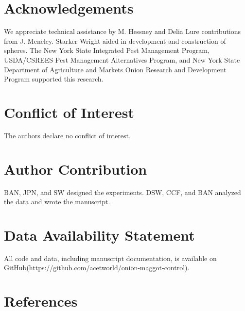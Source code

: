 \documentclass[num-refs]{wiley-article}
\begin{document}
\section*{Acknowledgements}
We appreciate technical assistance by M. Hessney and Delia Lure contributions from J. Meneley. Starker Wright aided in development and construction of spheres.  The New York State Integrated Pest Management Program, USDA/CSREES Pest Management Alternatives Program, and New York State Department of Agriculture and Markets Onion Research and Development Program supported this research. 

\section*{Conflict of Interest}
The authors declare no conflict of interest.  

\section*{Author Contribution}
BAN, JPN, and SW designed the experiments.  DSW, CCF, and BAN analyzed the data and wrote the manuscript.  


\section*{Data Availability Statement}
All code and data, including manuscript documentation, is available on GitHub(https://github.com/acetworld/onion-maggot-control).



\section{References}




\end{document}
